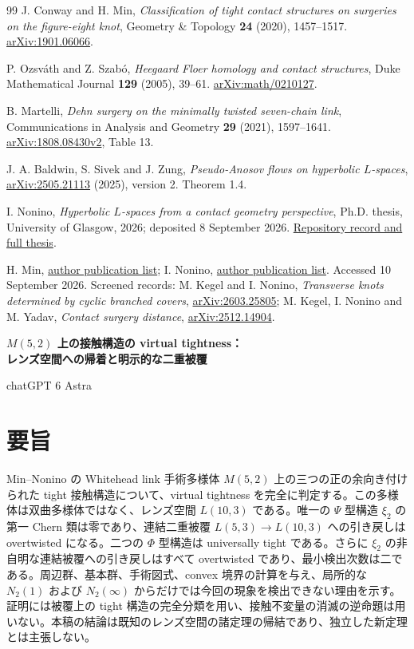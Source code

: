 \documentclass[12pt]{amsart}
\theoremstyle{definition}
\theoremstyle{remark}
\numberwithin{equation}{section}
\theoremstyle{definition}
\begin{document}
\begin{thebibliography}{99}
J. Conway and H. Min, \emph{Classification of tight contact structures on surgeries on the figure-eight knot}, Geometry \& Topology \textbf{24} (2020), 1457--1517. \href{https://arxiv.org/abs/1901.06066}{arXiv:1901.06066}.

P. Ozsv\'ath and Z. Szab\'o, \emph{Heegaard Floer homology and contact structures}, Duke Mathematical Journal \textbf{129} (2005), 39--61. \href{https://arxiv.org/abs/math/0210127}{arXiv:math/0210127}.

B. Martelli, \emph{Dehn surgery on the minimally twisted seven-chain link}, Communications in Analysis and Geometry \textbf{29} (2021), 1597--1641. \href{https://arxiv.org/abs/1808.08430}{arXiv:1808.08430v2}, Table 13.

J. A. Baldwin, S. Sivek and J. Zung, \emph{Pseudo-Anosov flows on hyperbolic $L$-spaces}, \href{https://arxiv.org/abs/2505.21113}{arXiv:2505.21113} (2025), version 2. Theorem 1.4.

I. Nonino, \emph{Hyperbolic $L$-spaces from a contact geometry perspective}, Ph.D. thesis, University of Glasgow, 2026; deposited 8 September 2026. \href{https://theses.gla.ac.uk/86215/}{Repository record and full thesis}.

H. Min, \href{https://hkmin27.github.io/}{author publication list}; I. Nonino, \href{https://sites.google.com/view/isaccononinomath/home-page}{author publication list}. Accessed 10 September 2026. Screened records: M. Kegel and I. Nonino, \emph{Transverse knots determined by cyclic branched covers}, \href{https://arxiv.org/abs/2603.25805}{arXiv:2603.25805}; M. Kegel, I. Nonino and M. Yadav, \emph{Contact surgery distance}, \href{https://arxiv.org/abs/2512.14904}{arXiv:2512.14904}.

\end{thebibliography}
\newpage
\begin{center}
{\Large\bfseries $M(5,2)$ 上の接触構造の virtual tightness：\\レンズ空間への帰着と明示的な二重被覆}
\medskip

chatGPT 6 Astra
\end{center}
\section*{要旨}
Min--Nonino の Whitehead link 手術多様体 $M(5,2)$ 上の三つの正の余向き付けられた tight 接触構造について、virtual tightness を完全に判定する。この多様体は双曲多様体ではなく、レンズ空間 $L(10,3)$ である。唯一の $\Psi$ 型構造 $\xi_2$ の第一 Chern 類は零であり、連結二重被覆 $L(5,3)\to L(10,3)$ への引き戻しは overtwisted になる。二つの $\Phi$ 型構造は universally tight である。さらに $\xi_2$ の非自明な連結被覆への引き戻しはすべて overtwisted であり、最小検出次数は二である。周辺群、基本群、手術図式、convex 境界の計算を与え、局所的な $N_2(1)$ および $N_2(\infty)$ からだけでは今回の現象を検出できない理由を示す。証明には被覆上の tight 構造の完全分類を用い、接触不変量の消滅の逆命題は用いない。本稿の結論は既知のレンズ空間の諸定理の帰結であり、独立した新定理とは主張しない。
\end{document}
